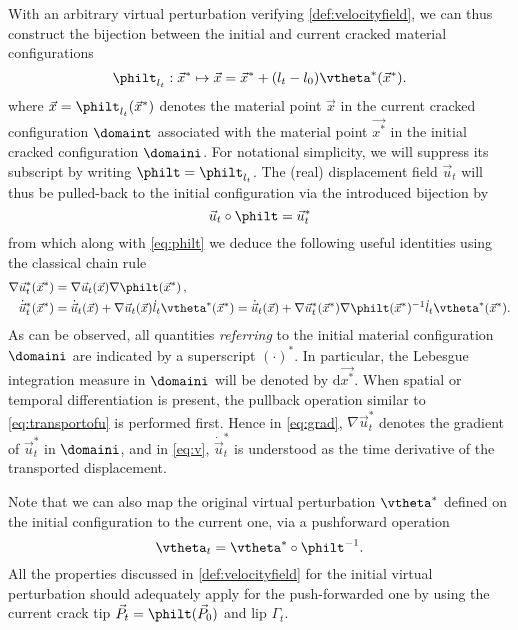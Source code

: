 With an arbitrary virtual perturbation verifying \cref{def:velocityfield}, we can thus construct the bijection between the initial and current cracked material configurations
\begin{equation} \label{eq:philt}
\philt_{l_t}:\vec{x}^*\mapsto\vec{x}=\vec{x}^*+(l_t-l_0)\vtheta^*(\vec{x}^*).
\end{equation}
where $\vec{x}=\philt_{l_t}(\vec{x}^*)$ denotes the material point $\vec{x}$ in the current cracked configuration $\domaint$ associated with the material point $\vec{x^*}$ in the initial cracked configuration $\domaini$. For notational simplicity, we will suppress its subscript by writing $\philt=\philt_{l_t}$. The (real) displacement field $\vec{u}_t$ will thus be pulled-back to the initial configuration via the introduced bijection by
\begin{equation} \label{eq:transportofu}
\vec{u}_t\circ\philt=\vec{u}_t^*
\end{equation}
from which along with \eqref{eq:philt} we deduce the following useful identities using the classical chain rule
\begin{align}
\nabla\vec{u}_t^*(\vec{x}^*) &= \nabla\vec{u}_t(\vec{x})\nabla\philt(\vec{x}^*)\,, \label{eq:grad} \\
\dot{\vec{u}}_t^*(\vec{x}^*) &= \dot{\vec{u}}_t(\vec{x})+\nabla\vec{u}_t(\vec{x})\dot{l}_t\vtheta^*(\vec{x}^*)=\dot{\vec{u}}_t(\vec{x})+\nabla\vec{u}_t^*(\vec{x}^*)\nabla\philt(\vec{x}^*)^{-1}\dot{l}_t\vtheta^*(\vec{x}^*). \label{eq:v}
\end{align}
As can be observed, all quantities \emph{referring} to the initial material configuration $\domaini$ are indicated by a superscript $(\cdot)^*$. In particular, the Lebesgue integration measure in $\domaini$ will be denoted by $\mathrm{d}\vec{x^*}$. When spatial or temporal differentiation is present, the pullback operation similar to \eqref{eq:transportofu} is performed first. Hence in \eqref{eq:grad}, $\nabla\vec{u}_t^*$ denotes the gradient of $\vec{u}_t^*$ in $\domaini$, and in \eqref{eq:v}, $\dot{\vec{u}}_t^*$ is understood as the time derivative of the transported displacement.

Note that we can also map the original virtual perturbation $\vtheta^*$ defined on the initial configuration to the current one, via a pushforward operation
\[
\vtheta_t=\vtheta^*\circ\philt^{-1}.
\]
All the properties discussed in \cref{def:velocityfield} for the initial virtual perturbation should adequately apply for the push-forwarded one by using the current crack tip $\vec{P}_t=\philt(\vec{P}_0)$ and lip $\Gamma_t$.

